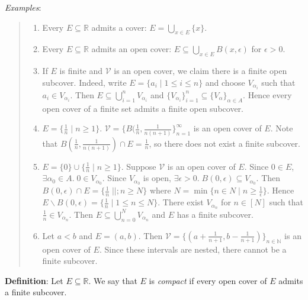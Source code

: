 \documentclass[11pt]{article}
\begin{document}
\emph{Examples}:
\begin{quote}\vspace{-0.3cm}
	\begin{enumerate}
	\item Every $E \subseteq \mathbb{R}$ admits a cover: $E = \bigcup_{x \in E} \{x\}$.
	\item Every $E \subseteq \mathbb{R}$ admits an open cover: $E \subseteq \bigcup_{x \in E} B(x, \epsilon)$ for $\epsilon > 0$.
	\item If $E$ is finite and $\mathcal{V}$ is an open cover, we claim there is a finite open subcover. Indeed, write $E = \{a_i \mid 1 \leq i \leq n\}$ and choose $V_{\alpha_i}$ such that $a_i \in V_{\alpha_i}$. Then $E \subseteq \bigcup_{i=1}^n V_{\alpha_i}$ and $\{V_{\alpha_i}\}_{i=1}^n \subseteq \{V_\alpha\}_{\alpha \in A}$. Hence every open cover of a finite set admits a finite open subcover.

	\item $E = \{\frac{1}{n} \mid n \geq 1\}$. $\mathcal{V} = \{B(\frac{1}{n}, \frac{1}{n(n+1)}\}_{n=1}^\infty$ is an open cover of $E$. Note that $B(\frac{1}{n}, \frac{1}{n(n+1)}) \cap E = \frac{1}{n}$, so there does not exist a finite subcover.

	\item $E = \{0\} \cup \{\frac{1}{n} \mid n \geq 1\}$. Suppose $\mathcal{V}$ is an open cover of $E$. Since $0 \in E$, $\exists \alpha_0 \in A.\; 0 \in V_{\alpha_0}$. Since $V_{\alpha_0}$ is open, $\exists \epsilon > 0.\; B(0, \epsilon) \subseteq V_{\alpha_0}$. Then $B(0, \epsilon) \cap E = \{\frac{1}{n} \;||; n \geq N\}$ where $N = \min \{n \in N \mid n \geq \frac{1}{\epsilon}\}$. Hence $E \backslash B(0, \epsilon) = \{\frac{1}{n} \mid 1 \leq n \leq N\}$. There exist $V_{\alpha_n}$ for $n \in [N]$ such that $\frac{1}{n} \in V_{\alpha_n}$. Then $E \subseteq \bigcup_{n=0}^N V_{\alpha_n}$ and $E$ has a finite subcover.

	\item Let $a < b$ and $E = (a,b)$. Then $\mathcal{V} = \{(a+\frac{1}{n+1}, b - \frac{1}{n+1})\}_{n \in \mathbb{N}}$ is an open cover of $E$. Since these intervals are nested, there cannot be a finite subcover.
	\end{enumerate}
\end{quote}

\textbf{Definition}: Let $E \subseteq \mathbb{R}$. We say that $E$ is \emph{compact} if every open cover of $E$ admits a finite subcover.
\end{document}
